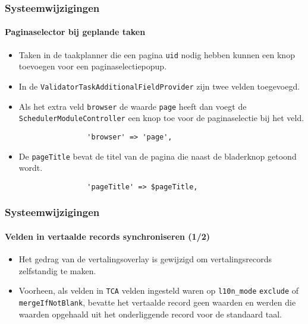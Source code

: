 \begin{frame}[fragile]
	\frametitle{Systeemwijzigingen}
	\framesubtitle{Paginaselector bij geplande taken}

	\begin{itemize}
		\item Taken in de taakplanner die een pagina \texttt{uid} nodig hebben kunnen een knop toevoegen
			voor een paginaselectiepopup.

		\item In de \texttt{ValidatorTaskAdditionalFieldProvider} zijn twee velden toegevoegd.

		\item Als het extra veld \texttt{browser} de waarde \texttt{page} heeft dan voegt de
			\texttt{SchedulerModuleController} een knop toe voor de paginaselectie bij het veld.

			\begin{lstlisting}
				'browser' => 'page',
			\end{lstlisting}

		\item De \texttt{pageTitle} bevat de titel van de pagina die naast de bladerknop getoond wordt.

			\begin{lstlisting}
				'pageTitle' => $pageTitle,
			\end{lstlisting}

	\end{itemize}

\end{frame}


\begin{frame}[fragile]
	\frametitle{Systeemwijzigingen}
	\framesubtitle{Velden in vertaalde records synchroniseren (1/2)}

	\lstset{basicstyle=\tiny\ttfamily}

	\begin{itemize}
		\item Het gedrag van de vertalingsoverlay is gewijzigd om vertalingsrecords zelfstandig te maken.

		\item Voorheen, als velden in \texttt{TCA} velden ingesteld waren op \texttt{l10n\_mode} \texttt{exclude}
		 	of \texttt{mergeIfNotBlank}, bevatte het vertaalde record geen waarden en werden die waarden opgehaald
		 	uit het onderliggende record voor de standaard taal.

	\end{itemize}

\end{frame}

